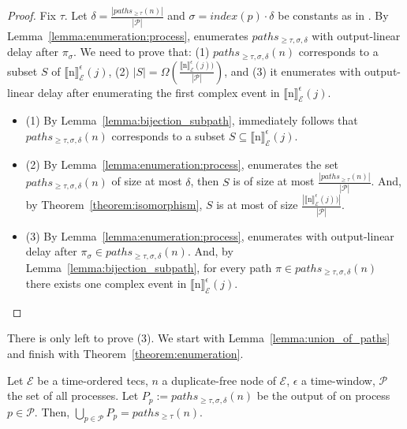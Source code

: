 \begin{proof}
  Fix $\tau$. Let $\delta = \frac{|paths_{\ge \tau}(n)|}{|\mathcal{P}|}$ and $\sigma = index(p) \cdot \delta$ be constants as in . By Lemma~\ref{lemma:enumeration:process},  enumerates $paths_{\ge \tau, \sigma, \delta}$ with output-linear delay after $\pi_{\sigma}$. We need to prove that: (1) $paths_{\ge \tau, \sigma, \delta}(n)$ corresponds to a subset $S$ of ${\llbracket \text{n} \rrbracket}^{\epsilon}_{\mathcal{E}}(j)$, (2) $|S| = \Omega(\frac{{\llbracket \text{n} \rrbracket}^{\epsilon}_{\mathcal{E}}(j))}{|\mathcal{P}|})$, and (3) it enumerates with output-linear delay after enumerating the first complex event in ${\llbracket \text{n} \rrbracket}^{\epsilon}_{\mathcal{E}}(j)$.

 \begin{itemize}
   \item (1) By Lemma~\ref{lemma:bijection_subpath}, immediately follows that $paths_{\ge \tau, \sigma, \delta}(n)$ corresponds to a subset $S \subseteq {\llbracket \text{n} \rrbracket}^{\epsilon}_{\mathcal{E}}(j)$.

   \item (2) By Lemma~\ref{lemma:enumeration:process},  enumerates the set $paths_{\ge \tau, \sigma, \delta}(n)$ of size at most $\delta$, then $S$ is of size at most $\frac{|paths_{\ge \tau}(n)|}{|\mathcal{P}|}$. And, by Theorem~\ref{theorem:isomorphism}, $S$ is at most of size $\frac{|{\llbracket \text{n} \rrbracket}^{\epsilon}_{\mathcal{E}}(j))|}{|\mathcal{P}|}$.

  \item (3) By Lemma~\ref{lemma:enumeration:process},  enumerates with output-linear delay after $\pi_{\sigma} \in paths_{\ge \tau, \sigma, \delta}(n)$. And, by Lemma~\ref{lemma:bijection_subpath}, for every path $\pi \in paths_{\ge \tau, \sigma, \delta}(n)$ there exists one complex event in ${\llbracket \text{n} \rrbracket}^{\epsilon}_{\mathcal{E}}(j)$.
 \end{itemize}

\end{proof}

There is only left to prove (3). We start with Lemma~\ref{lemma:union_of_paths} and finish with Theorem~\ref{theorem:enumeration}.

\begin{lemma}\label{lemma:union_of_paths}
  Let $\mathcal{E}$ be a time-ordered \acrshort{tecs}, $n$ a duplicate-free node of $\mathcal{E}$, $\epsilon$ a time-window, $\mathcal{P}$ the set of all processes. Let $P_{p} := paths_{\ge \tau, \sigma, \delta}(n)$ be the output of  on process $p \in \mathcal{P}$. Then, $\bigcup\limits_{p \in \mathcal{P}} P_{p} = paths_{\ge \tau}(n)$.
\end{lemma}

